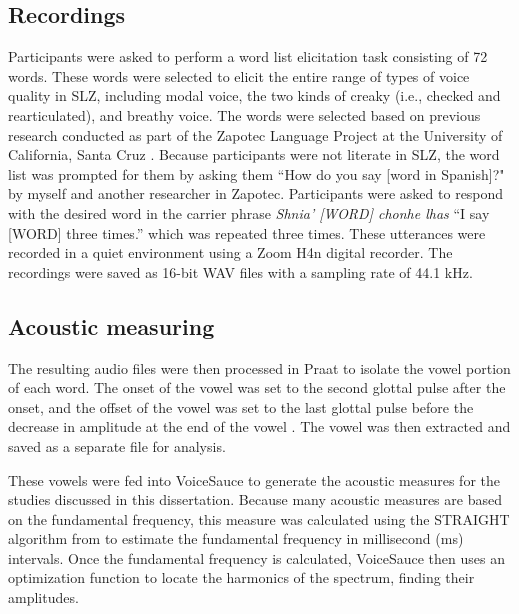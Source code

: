 \subsection{Recordings} \label{sec:acousticlandscape:recordings} 
Participants were asked to perform a word list elicitation task consisting of 72 words. These words were selected to elicit the entire range of types of voice quality in SLZ, including modal voice, the two kinds of creaky (i.e., checked and rearticulated), and breathy voice. The words were selected based on previous research conducted as part of the Zapotec Language Project at the University of California, Santa Cruz \citep{ZapotecLanguageProject}. 
Because participants were not literate in SLZ, the word list was prompted for them by asking them ``How do you say [word in Spanish]?" by myself and another researcher in Zapotec. Participants were asked to respond with the desired word in the carrier phrase \textit{Shnia' [WORD] chonhe lhas} ``I say [WORD] three times.'' which was repeated three times. These utterances were recorded in a quiet environment using a Zoom H4n digital recorder. The recordings were saved as 16-bit WAV files with a sampling rate of 44.1 kHz.

\subsection{Acoustic measuring} \label{sec:acousticlandscape:analysis}

The resulting audio files were then processed in Praat to isolate the vowel portion of each word. The onset of the vowel was set to the second glottal pulse after the onset, and the offset of the vowel was set to the last glottal pulse before the decrease in amplitude at the end of the vowel \citep{garellekAcousticDiscriminabilityComplex2020}. The vowel was then extracted and saved as a separate file for analysis.

These vowels were fed into VoiceSauce \citep{shueVoiceSauceProgramVoice2011} to generate the acoustic measures for the studies discussed in this dissertation. Because many acoustic measures are based on the fundamental frequency, this measure was calculated using the STRAIGHT algorithm from \citep{kawaharaInstantaneousfrequencybasedPitchExtraction1998} to estimate the fundamental frequency in millisecond (ms) intervals. Once the fundamental frequency is calculated, VoiceSauce then uses an optimization function to locate the harmonics of the spectrum, finding their amplitudes.

